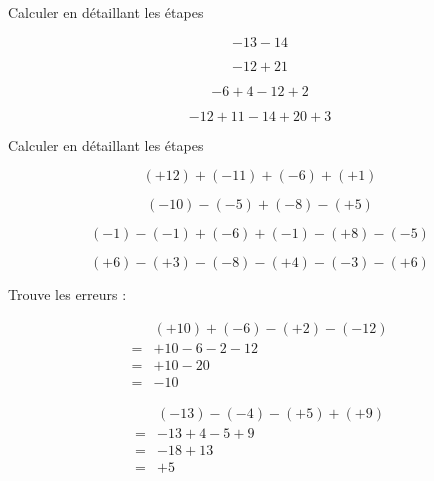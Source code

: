  Calculer en détaillant les étapes

\begin{multicols}{2}
    $$-13-14$$
    \vspace*{3em}

    $$-12+21$$
    \vspace*{7em}\columnbreak

    $$-6+4-12+2$$
    \vspace*{3em}

    $$-12+11-14+20+3$$
    \vspace*{7em}
\end{multicols}

\vspace*{-1em}

 Calculer en détaillant les étapes

\begin{multicols}{2}
    $$(+12)+(-11)+(-6)+(+1)$$
    \vspace*{8em}

    $$(-10)-(-5)+(-8)-(+5)$$
    \vspace*{8em}\columnbreak

    $$(-1)-(-1)+(-6)+(-1)-(+8)-(-5)$$
    \vspace*{8em}

    $$(+6)-(+3)-(-8)-(+4)-(-3)-(+6)$$
    \vspace*{8em}
\end{multicols}

\newpage



 Trouve les erreurs :

\begin{multicols}{2}
    \noindent\begin{align*}
        &(+10)+(-6)-(+2)-(-12)\\
        =&+10-6-2-12\\
        =&+10-20\\
        =&-10
    \end{align*}

    \noindent\begin{align*}
        &(-13)-(-4)-(+5)+(+9)\\
        =&-13+4-5+9\\
        =&-18+13\\
        =&+5
    \end{align*}

\end{multicols}

